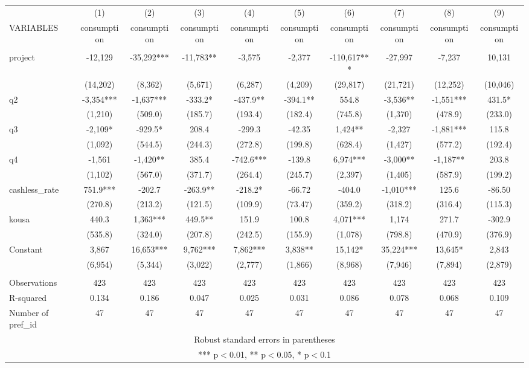 \documentclass[]{article}
\begin{document}
\begin{tabular}{lccccccccc} \hline
 & (1) & (2) & (3) & (4) & (5) & (6) & (7) & (8) & (9) \\
VARIABLES & consumption & consumption & consumption & consumption & consumption & consumption & consumption & consumption & consumption \\ \hline
 &  &  &  &  &  &  &  &  &  \\
project & -12,129 & -35,292*** & -11,783** & -3,575 & -2,377 & -110,617*** & -27,997 & -7,237 & 10,131 \\
 & (14,202) & (8,362) & (5,671) & (6,287) & (4,209) & (29,817) & (21,721) & (12,252) & (10,046) \\
q2 & -3,354*** & -1,637*** & -333.2* & -437.9** & -394.1** & 554.8 & -3,536** & -1,551*** & 431.5* \\
 & (1,210) & (509.0) & (185.7) & (193.4) & (182.4) & (745.8) & (1,370) & (478.9) & (233.0) \\
q3 & -2,109* & -929.5* & 208.4 & -299.3 & -42.35 & 1,424** & -2,327 & -1,881*** & 115.8 \\
 & (1,092) & (544.5) & (244.3) & (272.8) & (199.8) & (628.4) & (1,427) & (577.2) & (192.4) \\
q4 & -1,561 & -1,420** & 385.4 & -742.6*** & -139.8 & 6,974*** & -3,000** & -1,187** & 203.8 \\
 & (1,102) & (567.0) & (371.7) & (264.4) & (245.7) & (2,397) & (1,405) & (587.9) & (199.2) \\
cashless\_rate & 751.9*** & -202.7 & -263.9** & -218.2* & -66.72 & -404.0 & -1,010*** & 125.6 & -86.50 \\
 & (270.8) & (213.2) & (121.5) & (109.9) & (73.47) & (359.2) & (318.2) & (316.4) & (115.3) \\
kousa & 440.3 & 1,363*** & 449.5** & 151.9 & 100.8 & 4,071*** & 1,174 & 271.7 & -302.9 \\
 & (535.8) & (324.0) & (207.8) & (242.5) & (155.9) & (1,078) & (798.8) & (470.9) & (376.9) \\
Constant & 3,867 & 16,653*** & 9,762*** & 7,862*** & 3,838** & 15,142* & 35,224*** & 13,645* & 2,843 \\
 & (6,954) & (5,344) & (3,022) & (2,777) & (1,866) & (8,968) & (7,946) & (7,894) & (2,879) \\
 &  &  &  &  &  &  &  &  &  \\
Observations & 423 & 423 & 423 & 423 & 423 & 423 & 423 & 423 & 423 \\
R-squared & 0.134 & 0.186 & 0.047 & 0.025 & 0.031 & 0.086 & 0.078 & 0.068 & 0.109 \\
 Number of pref\_id & 47 & 47 & 47 & 47 & 47 & 47 & 47 & 47 & 47 \\ \hline
\multicolumn{10}{c}{ Robust standard errors in parentheses} \\
\multicolumn{10}{c}{ *** p$<$0.01, ** p$<$0.05, * p$<$0.1} \\
\end{tabular}
\end{document}
